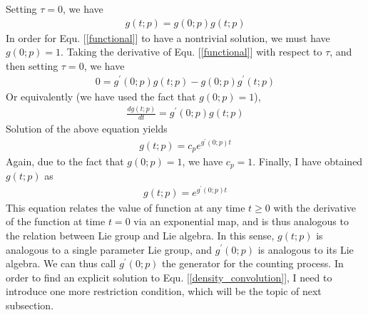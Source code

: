 \documentclass[10pt]{article}
\numberwithin{figure}{section}
\numberwithin{equation}{section}
\begin{document}
Setting $\tau = 0$, we have 
\begin{eqnarray}
g(t; p) = g(0; p) g(t; p)
\end{eqnarray}
In order for Equ. [\ref{functional}] to have a nontrivial solution, we must have $g(0; p) = 1$. Taking the derivative of Equ. [\ref{functional}] with respect to $\tau$, and then setting $\tau = 0$, we have 
\begin{eqnarray}
0 = g^{\prime}(0; p) g(t; p) - g(0; p) g^{\prime}(t; p)
\end{eqnarray}
Or equivalently (we have used the fact that $g(0; p) = 1$), 
\begin{eqnarray}
\frac{dg(t; p)}{dt} = g^{\prime}(0; p) g(t; p)
\end{eqnarray}
Solution of the above equation yields 
\begin{eqnarray}
g(t; p) = c_{p} e^{g^{\prime}(0; p) t}
\end{eqnarray}
Again, due to the fact that  $g(0; p) = 1$, we have $c_{p} = 1$. Finally, I have obtained $g(t; p)$ as 
\begin{eqnarray}
g(t; p) = e^{g^{\prime}(0; p) t}
\end{eqnarray}
This equation relates the value of function at any time $t \ge 0$ with the derivative of the function at time $t = 0$ via an exponential map, and is thus analogous to the relation between Lie group and Lie algebra. In this sense, $g(t; p)$ is analogous to a single parameter Lie group, and $g^{\prime}(0; p)$ is analogous to its Lie algebra. We can thus call $g^{\prime}(0; p)$ the generator for the counting process. 
In order to find an explicit solution to Equ. [\ref{density_convolution}], I need to introduce one more restriction condition, which will be the topic of next subsection. 
\end{document}
